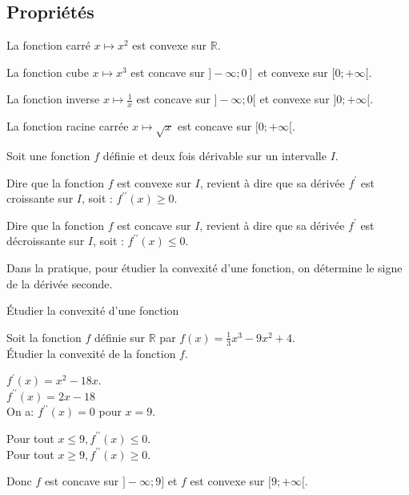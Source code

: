 \subsection{Propriétés}

\begin{bprops}
	\begin{itemProp}
		\item La fonction carré \(x \mapsto x^{2}\) est convexe sur \(\mathbb{R}\).
		\item La fonction cube \(x \longmapsto x^{3}\) est concave sur \(\left.]-\infty ; 0\right]\) et convexe sur \([0 ;+\infty[\).
		\item La fonction inverse \(x \mapsto \frac{1}{x}\) est concave sur \(]-\infty ; 0[\) et convexe sur \(] 0 ;+\infty[\).
		\item La fonction racine carrée \(x \longmapsto \sqrt{x}\) est concave sur \([0 ;+\infty[\).
	\end{itemProp}
\end{bprops}

\begin{bprop}
	Soit une fonction \(f\) définie et deux fois dérivable sur un intervalle \(I\).
	
	\begin{itemProp}
		\item Dire que la fonction \(f\) est convexe sur \(I\), revient à dire que sa dérivée \(f^{\prime}\) est croissante sur \(I\), soit : \(f^{\prime \prime}(x) \geq 0\).
		\item Dire que la fonction \(f\) est concave sur \(I\), revient à dire que sa dérivée \(f^{\prime}\) est décroissante sur \(I\), soit : \(f^{\prime \prime}(x) \leq 0\).
	\end{itemProp}
\end{bprop}		

\begin{brmq}
	Dans la pratique, pour étudier la convexité d'une fonction, on détermine le signe de la dérivée seconde.
\end{brmq}

\begin{bmethodet}{Étudier la convexité d'une fonction}
	
	Soit la fonction \(f\) définie sur \(\mathbb{R}\) par \(f(x)=\frac{1}{3} x^{3}-9 x^{2}+4\).\\
	Étudier la convexité de la fonction \(f\).
	
	
	\(f^{\prime}(x)=x^{2}-18 x\).\\
	\(f^{\prime \prime}(x)=2 x-18\)\\
	On a: \(f^{\prime \prime}(x)=0\) pour \(x=9\).
	
	Pour tout \(x \leq 9, f^{\prime \prime}(x) \leq 0\).\\
	Pour tout \(x \geq 9, f^{\prime \prime}(x) \geq 0\).
	
	Donc \(f\) est concave sur \(]-\infty ; 9]\) et \(f\) est convexe sur \([9 ;+\infty[\).
\end{bmethodet}

